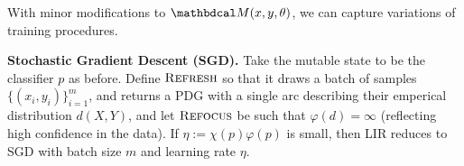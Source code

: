 \documentclass[twoside]{article}
\theoremstyle{plain}
\theoremstyle{definition}
\theoremstyle{remark}
\begin{document}
With minor modifications to $\dg M(x,y,\theta)$, we can capture variations of training procedures.

\textbf{Stochastic Gradient Descent (SGD).} \label{sec:SGD}
Take the mutable state to be the classifier $p$ as before.
Define $\textsc{Refresh}$ so that it draws a batch of samples $\{(x_i,y_i)\}_{i=1}^m$,
and returns a PDG with a single arc describing their emperical distribution $d(X,Y)$, and
let $\textsc{Refocus}$ be such that $\varphi(d) = \infty$
   (reflecting high confidence in the data).
If $\eta := \chi(p) \varphi(p)$ is small, then
   LIR reduces to SGD with batch size $m$ and learning rate $\eta$.
\end{document}
